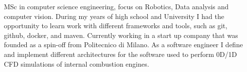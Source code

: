 

\begin{cvparagraph}

MSc in computer science engineering, focus on Robotics, Data analysis and computer vision. During my years of high school and University I had the opportunity to learn work with different frameworks and tools, such as git, github, docker, and maven. Currently working in a start up company that was founded as a spin-off from Politecnico di Milano. As a software engineer I define and implement different architectures for the software used to perform 0D/1D CFD simulations of internal combustion engines.
\end{cvparagraph}
